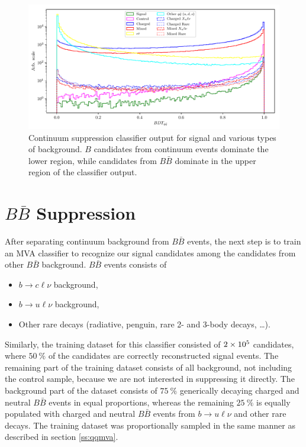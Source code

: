 \begin{figure}[H]
	\centering
	\captionsetup{width=0.8\linewidth}
	\includegraphics[width=\linewidth]{fig/cs_BDT}
	\caption{Continuum suppression classifier output for signal and various types of background. $B$ candidates from continuum events dominate the lower region, while candidates from $B\bar B$ dominate in the upper region of the classifier output.}
	\label{fig:cs_mva}
\end{figure}

\section{\texorpdfstring{$B\bar B$}{BB-bar} Suppression}

After separating continuum background from $B \bar B$ events, the next step is to train an MVA classifier to recognize our signal candidates among the candidates from other $B \bar B$ background. $B \bar B$ events consists of
\begin{itemize}
	\item $b \to c \ell \nu$ background,
	\item $b \to u \ell \nu$ background,
	\item Other rare decays (radiative, penguin, rare 2- and 3-body decays, \dots).
\end{itemize}

Similarly, the training dataset for this classifier consisted of $2\times 10^{5}$ candidates, where $50~\%$ of the candidates are correctly reconstructed signal events. The remaining part of the training dataset consists of all background, not including the control sample, because we are not interested in suppressing it directly. The background part of the dataset consists of $75~\%$  generically decaying charged and neutral $B \bar B$ events in equal proportions, whereas the remaining $25~\%$ is equally populated with charged and neutral $B \bar B$ events from $b \to u \ell \nu$ and other rare decays. The training dataset was proportionally sampled in the same manner as described in section \ref{ss:qqmva}.


